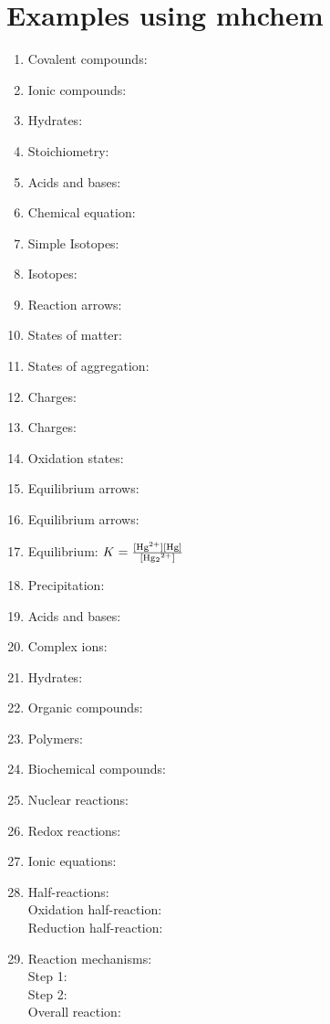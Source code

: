 \documentclass[border=5mm]{standalone}
\begin{document}
\begin{minipage}{\textwidth}
\section*{Examples using mhchem}

\begin{enumerate}
\item Covalent compounds: 
\item Ionic compounds: 
\item Hydrates: 
\item Stoichiometry: 
\item Acids and bases: 
\item Chemical equation: 
\item Simple Isotopes: 
\item Isotopes: 
\item Reaction arrows: 
\item States of matter: 
\item States of aggregation: 
\item Charges: 
\item Charges: 
\item Oxidation states: 
\item Equilibrium arrows: 
\item Equilibrium arrows: 
\item Equilibrium: $K = \ce{\frac{[Hg^2+][Hg]}{[Hg2^2+]}}$
\item Precipitation: 
\item Acids and bases: 
\item Complex ions: 
\item Hydrates: 
\item Organic compounds: 
\item Polymers: 
\item Biochemical compounds: 
\item Nuclear reactions: 
\item Redox reactions: 
\item Ionic equations: 
\item Half-reactions:\\ 
Oxidation half-reaction:  \\
Reduction half-reaction: 
\item Reaction mechanisms:\\
Step 1:  \\
Step 2:  \\
Overall reaction: 
\end {enumerate}
\end {minipage}
\end{document}
